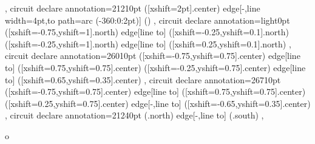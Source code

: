 {{  },
 circuit declare annotation={2121}{0pt} %
  {
   ([xshift=2pt]\tikzlastnode.center) edge[-,line width=4pt,to path={arc (-360:0:2pt)}] ()
  },
 circuit declare annotation={light}{0pt} %
  {
   ([xshift=-0.75\tikzcircuitssizeunit,yshift=1\tikzcircuitssizeunit]\tikzlastnode.north) edge[line to] ([xshift=-0.25\tikzcircuitssizeunit,yshift=0.1\tikzcircuitssizeunit]\tikzlastnode.north)
   ([xshift=-0.25\tikzcircuitssizeunit,yshift=1\tikzcircuitssizeunit]\tikzlastnode.north) edge[line to] ([xshift=0.25\tikzcircuitssizeunit,yshift=0.1\tikzcircuitssizeunit]\tikzlastnode.north)
  },
 circuit declare annotation={2601}{0pt} %
  {
   ([xshift=-0.75\tikzcircuitssizeunit,yshift=0.75\tikzcircuitssizeunit]\tikzlastnode.center) edge[line to] ([xshift=0.75\tikzcircuitssizeunit,yshift=0.75\tikzcircuitssizeunit]\tikzlastnode.center)
   ([xshift=-0.25\tikzcircuitssizeunit,yshift=0.75\tikzcircuitssizeunit]\tikzlastnode.center) edge[line to] ([xshift=0.65\tikzcircuitssizeunit,yshift=0.35\tikzcircuitssizeunit]\tikzlastnode.center)
  },
  circuit declare annotation={2671}{0pt} %
   {
    ([xshift=-0.75\tikzcircuitssizeunit,yshift=0.75\tikzcircuitssizeunit]\tikzlastnode.center) edge[line to] ([xshift=0.75\tikzcircuitssizeunit,yshift=0.75\tikzcircuitssizeunit]\tikzlastnode.center)
    ([xshift=0.25\tikzcircuitssizeunit,yshift=0.75\tikzcircuitssizeunit]\tikzlastnode.center) edge[-,line to] ([xshift=-0.65\tikzcircuitssizeunit,yshift=0.35\tikzcircuitssizeunit]\tikzlastnode.center)
   },
  circuit declare annotation={2124}{0pt} %
   {
    (\tikzlastnode.north) edge[-,line to] (\tikzlastnode.south)
   },
}

\makeatletter
\newcommand\currentcoordinate{\the\tikz@lastxsaved,\the\tikz@lastysaved}

\newcommand{\crossings}[2]{
 \fill [name intersections={of=#1 and #2, name=i, total=\t}]
 \foreach \s in {1,...,\t}{(i-\s) node[crossing] {}};
}


 { o }
{
 \begin{scope}[\fscolor, line width=\fslinewidth, \fslinetype]
  }
  {
 \end{scope}
}

